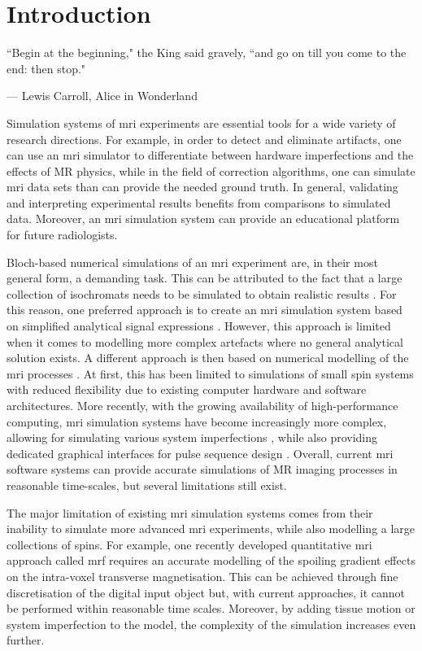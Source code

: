 \chapter{Introduction}
\label{chapterlabel1}
\epigraph{``Begin at the beginning," the King said gravely, ``and go on till you come to the end: then stop."}{--- \textup{Lewis Carroll}, Alice in Wonderland}


Simulation systems of \ac{mri} experiments are essential tools for a wide variety of research directions.
For example, in order to detect and eliminate artifacts, one can use an \ac{mri} simulator to differentiate between hardware imperfections and the effects of MR physics,
while in the field of correction algorithms, one can simulate \ac{mri} data sets than can provide the needed ground truth.
In general, validating and interpreting experimental results benefits from comparisons to simulated data.
Moreover, an \ac{mri} simulation system can provide an educational platform for future radiologists.

\hfill

Bloch-based numerical simulations of an \ac{mri} experiment are, in their most general form, a demanding task.
This can be attributed to the fact that a large collection of isochromats needs to be simulated to obtain realistic results \cite{Shkarin1997}. 
For this reason, one preferred approach is to create an \ac{mri} simulation system based on simplified analytical signal expressions \cite{Hacklander2005} \cite{Torheim1994} \cite{Yoder2004}.
However, this approach is limited when it comes to modelling more complex artefacts 
where no general analytical solution exists.
A different approach is then based on numerical modelling of the \ac{mri} processes \cite{Summers1986} \cite{Olsson1995}.
At first, this has been limited to simulations of small spin systems with reduced flexibility due to existing computer hardware and software architectures.
More recently, with the growing availability of high-performance computing, \ac{mri} simulation systems have become increasingly more complex, allowing for simulating various system imperfections \cite{Benoit-Cattin2005} \cite{Drobnjak2006}, while also providing dedicated graphical interfaces for pulse sequence design \cite{Stocker2010}.
Overall, current \ac{mri} software systems can provide accurate simulations of MR imaging processes in reasonable time-scales, but several limitations still exist.

\hfill

The major limitation of existing \ac{mri} simulation systems comes from their inability to simulate more advanced \ac{mri} experiments, while also modelling a large collections of spins.
For example, one recently developed quantitative \ac{mri} approach called \ac{mrf} requires an accurate modelling of the spoiling gradient effects on the intra-voxel transverse magnetisation.
This can be achieved through fine discretisation of the digital input object but, with current approaches, it cannot be performed within reasonable time scales.
Moreover, by adding tissue motion or system imperfection to the model, the complexity of the simulation increases even further.

